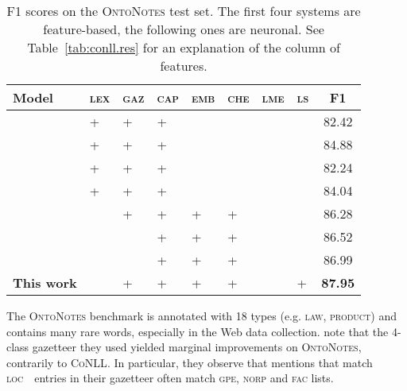 \documentclass[11pt]{article}
\newcommand{\conll}{\textsc{CoNLL}}
\newcommand{\onto}{\textsc{OntoNotes}}
\newcommand{\loc}{\textsc{loc}}
\newcommand{\gpe}{\textsc{gpe}}
\newcommand{\norp}{\textsc{norp}}
\newcommand{\fac}{\textsc{fac}}
\newcommand{\lll}{\textsc{lex}}
\newcommand{\ggg}{\textsc{gaz}}
\newcommand{\ccc}{\textsc{cap}}
\newcommand{\chhh}{\textsc{che}}
\newcommand{\eee}{\textsc{emb}}
\newcommand{\mmm}{\textsc{lme}}
\newcommand{\sss}{\textsc{ls}}
\begin{document}
	
	\begin{table}[h]
		
		\begin{center}
\setlength{\tabcolsep}{1mm}  
			\begin{tabular}{|l|lllllll|c|}
				\hline \textbf{Model} & \lll & \ggg & \ccc &\eee & \chhh & \mmm & \sss & \textbf{F1} \\ 
				\hline
				\cite{finkel2009joint} 						& \textsc{+}& \textsc{+}& \textsc{+} & &&&	& 82.42 \\
				\cite{ratinov2009design}  		& \textsc{+}& \textsc{+}& \textsc{+} & &&&	& 84.88 \\
				\cite{passos2014lexicon} 				        & \textsc{+}& \textsc{+}& \textsc{+} & &&&	& 82.24 \\
				\cite{durrett2014joint} 					& \textsc{+}& \textsc{+}& \textsc{+} & &&&	& 84.04 \\
				\hline 
				\cite{chiu2015named} &  & \textsc{+}& \textsc{+}& \textsc{+} & \textsc{+} &&	& 86.28 \\
				\cite{shen2017deep} & & & \textsc{+}& \textsc{+}& \textsc{+} &  & 	& 86.52 \\
				\cite{strubell2017fast} & & & \textsc{+}& \textsc{+}& \textsc{+} &  & 	& 86.99 \\
				
				\hline
				\textbf{This work} 	& & \textsc{+}& \textsc{+} & \textsc{+}& \textsc{+} &  	& \textsc{+}	& \bf 87.95 \\
				\hline
			\end{tabular}
					\end{center}
		
		
		\caption{F1 scores on the \onto{} test set. The first four systems are feature-based, the following ones are neuronal. See Table~\ref{tab:conll.res} for an explanation of the column of features.}
		\label{tab:onto.res} 
		
	\end{table}

	The \onto{} benchmark  is annotated with 18 types (e.g. \textsc{law}, \textsc{product}) and  contains many rare words, especially in the Web data collection.  note that the 4-class gazetteer they used  yielded marginal improvements on \onto{}, contrarily to \conll. In particular, they observe that mentions that match \loc{~} entries in their gazetteer often match  \gpe, \norp{} and \fac{} lists.  
	
\end{document}
